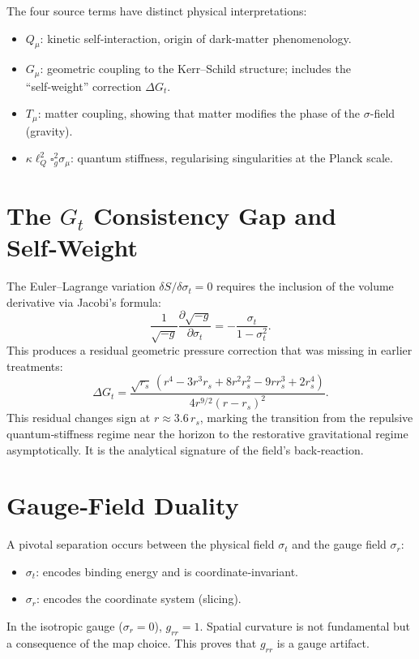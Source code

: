\documentclass[12pt,prd,preprintnumbers,amsmath,amssymb]{revtex4-2}
\begin{document}
The four source terms have distinct physical interpretations:
\begin{itemize}
\item $Q_\mu$: kinetic self‑interaction, origin of dark‑matter phenomenology.
\item $G_\mu$: geometric coupling to the Kerr–Schild structure; includes the “self‑weight” correction $\Delta G_t$.
\item $T_\mu$: matter coupling, showing that matter modifies the phase of the $\sigma$-field (gravity).
\item $\kappa\ell_Q^2 \square_g^2 \sigma_\mu$: quantum stiffness, regularising singularities at the Planck scale.
\end{itemize}

\section{The $G_t$ Consistency Gap and Self‑Weight}

The Euler–Lagrange variation $\delta S/\delta \sigma_t = 0$ requires the inclusion of the volume derivative via Jacobi’s formula:
\begin{equation}
\frac{1}{\sqrt{-g}}\frac{\partial\sqrt{-g}}{\partial\sigma_t} = -\frac{\sigma_t}{1-\sigma_t^2}.
\end{equation}
This produces a residual geometric pressure correction that was missing in earlier treatments:
\begin{equation}
\boxed{\Delta G_t = \frac{\sqrt{r_s}\,(r^4-3r^3r_s+8r^2r_s^2-9rr_s^3+2r_s^4)}{4r^{9/2}(r-r_s)^2}.}
\label{eq:deltaGt}
\end{equation}
This residual changes sign at $r \approx 3.6\,r_s$, marking the transition from the repulsive quantum‑stiffness regime near the horizon to the restorative gravitational regime asymptotically. It is the analytical signature of the field’s back‑reaction.

\section{Gauge‑Field Duality}

A pivotal separation occurs between the physical field $\sigma_t$ and the gauge field $\sigma_r$:
\begin{itemize}
\item $\sigma_t$: encodes binding energy and is coordinate‑invariant.
\item $\sigma_r$: encodes the coordinate system (slicing).
\end{itemize}
In the isotropic gauge ($\sigma_r = 0$), $g_{rr}=1$. Spatial curvature is not fundamental but a consequence of the map choice. This proves that $g_{rr}$ is a gauge artifact.
\end{document}
